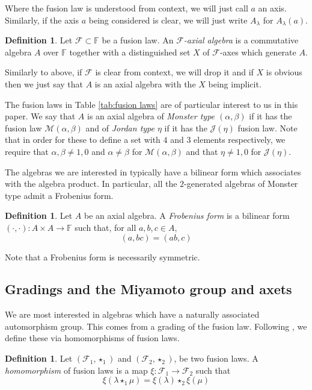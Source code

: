 \documentclass[11pt, a4paper]{article}
\theoremstyle{plain}
\theoremstyle{definition}
\newtheorem{definition}[theorem]{Definition}
\newcommand\al{\alpha}
\newcommand\bt{\beta}
\newcommand\lm{\lambda}
\newcommand\cF{\mathcal{F}}
\newcommand\cJ{\mathcal{J}}
\newcommand\cM{\mathcal{M}}
\newcommand\FF{\mathbb{F}}
\newcommand{\0}{\overline{0}}
\newcommand{\2}{\overline{2}}
\newcommand{\1}{\mathbbm{1}}
\begin{document}
Where the fusion law is understood from context, we will just call $a$ an axis.  Similarly, if the axis $a$ being considered is clear, we will just write $A_\lm$ for $A_\lm(a)$.

\begin{definition}
Let $\cF \subset \FF$ be a fusion law.  An \emph{$\cF$-axial algebra} is a commutative algebra $A$ over $\FF$ together with a distinguished set $X$ of $\cF$-axes which generate $A$.
\end{definition}

Similarly to above, if $\cF$ is clear from context, we will drop it and if $X$ is obvious then we just say that $A$ is an axial algebra with the $X$ being implicit.

The fusion laws in Table \ref{tab:fusion laws} are of particular interest to us in this paper.  We say that $A$ is an axial algebra of \emph{Monster type $(\al, \bt)$} if it has the fusion law $\cM(\al, \bt)$ and of \emph{Jordan type $\eta$} if it has the $\cJ(\eta)$ fusion law.  Note that in order for these to define a set with $4$ and $3$ elements respectively, we require that $\al, \bt \neq 1,0$ and $\al \neq \bt$ for $\cM(\al, \bt)$ and that $\eta \neq 1,0$ for $\cJ(\eta)$.

The algebras we are interested in typically have a bilinear form which associates with the algebra product.  In particular, all the $2$-generated algebras of Monster type admit a Frobenius form.

\begin{definition}
Let $A$ be an axial algebra.  A \emph{Frobenius form} is a bilinear form $(\cdot, \cdot) \colon A \times A \to \FF$ such that, for all $a,b,c \in A$,
\[
(a,bc)=(ab,c)
\]
\end{definition}

Note that a Frobenius form is necessarily symmetric.



\subsection{Gradings and the Miyamoto group and axets}

We are most interested in algebras which have a naturally associated automorphism group.  This comes from a grading of the fusion law.  Following \cite{DPSV}, we define these via homomorphisms of fusion laws.

\begin{definition}
Let $(\cF_1, \star_1)$ and $(\cF_2, \star_2)$, be two fusion laws.  A \emph{homomorphism} of fusion laws is a map $\xi \colon \cF_1 \to \cF_2$ such that
\[
\xi(\lm \star_1 \mu) = \xi(\lm) \star_2 \xi(\mu)
\]
\end{definition}
\end{document}
